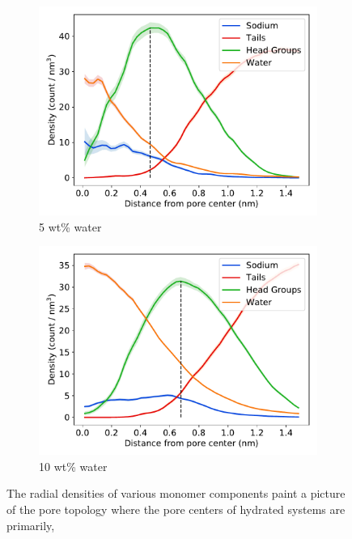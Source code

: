 \documentclass[journal=jpcbfk,manuscript=article]{achemso}
\begin{document}
\begin{figure}[!htb]
\begin{subfigure}{0.45\textwidth}
  \label{fig:monomer_color_coded}
  \end{subfigure}
  \begin{subfigure}{0.45\textwidth}
  \includegraphics[width=\textwidth]{component_density_5wt.pdf}
  \caption{5 wt\% water}\label{fig:component_density_5wt}
  \end{subfigure}
  \begin{subfigure}{0.45\textwidth}
  \includegraphics[width=\textwidth]{component_density_10wt.pdf}
  \caption{10 wt\% water}\label{fig:component_density_10wt}
  \end{subfigure}
  \caption{The radial densities of various monomer components paint a 
  picture of the pore topology where the pore centers of hydrated systems are primarily,
}
\end{figure}
\end{document}
